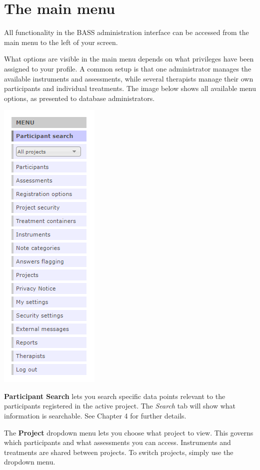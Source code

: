 \documentclass[]{book}
\begin{document}
\hypertarget{the-main-menu}{%
\chapter{The main menu}\label{the-main-menu}}

All functionality in the BASS administration interface can be accessed from the main menu to the left of your screen.

What options are visible in the main menu depends on what privileges have been assigned to your profile. A common setup is that one administrator manages the available instruments and assessments, while several therapists manage their own participants and individual treatments. The image below shows all available menu options, as presented to database administrators.

\includegraphics{images/main-menu.png}

\textbf{Participant Search} lets you search specific data points relevant to the participants registered in the active project. The \emph{Search} tab will show what information is searchable. See Chapter 4 for further details.

The \textbf{Project} dropdown menu lets you choose what project to view. This governs which participants and what assessments you can access. Instruments and treatments are shared between projects. To switch projects, simply use the dropdown menu.
\end{document}

